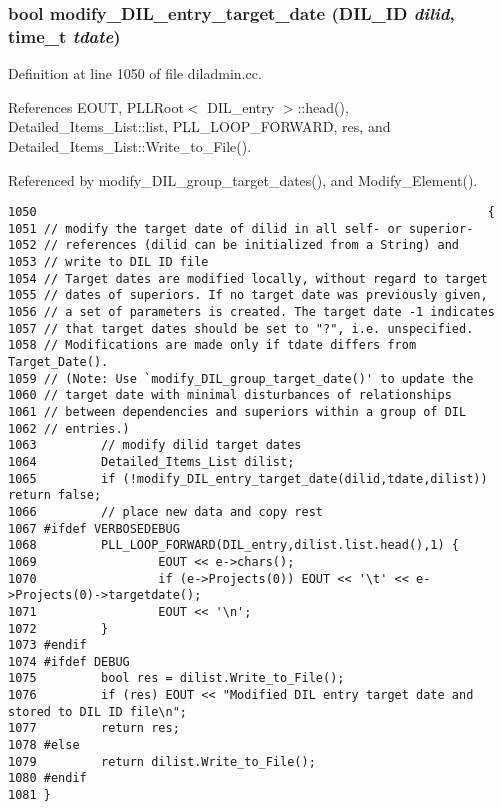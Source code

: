 \subsubsection{\setlength{\rightskip}{0pt plus 5cm}bool modify\_\-DIL\_\-entry\_\-target\_\-date ({\bf DIL\_\-ID} {\em dilid}, time\_\-t {\em tdate})}\label{diladmin_8cc_a16}




Definition at line 1050 of file diladmin.cc.

References EOUT, PLLRoot$<$ DIL\_\-entry $>$::head(), Detailed\_\-Items\_\-List::list, PLL\_\-LOOP\_\-FORWARD, res, and Detailed\_\-Items\_\-List::Write\_\-to\_\-File().

Referenced by modify\_\-DIL\_\-group\_\-target\_\-dates(), and Modify\_\-Element().



\footnotesize\begin{verbatim}1050                                                               {
1051 // modify the target date of dilid in all self- or superior-
1052 // references (dilid can be initialized from a String) and
1053 // write to DIL ID file
1054 // Target dates are modified locally, without regard to target
1055 // dates of superiors. If no target date was previously given,
1056 // a set of parameters is created. The target date -1 indicates
1057 // that target dates should be set to "?", i.e. unspecified.
1058 // Modifications are made only if tdate differs from Target_Date().
1059 // (Note: Use `modify_DIL_group_target_date()' to update the
1060 // target date with minimal disturbances of relationships
1061 // between dependencies and superiors within a group of DIL
1062 // entries.)
1063         // modify dilid target dates
1064         Detailed_Items_List dilist;
1065         if (!modify_DIL_entry_target_date(dilid,tdate,dilist)) return false;
1066         // place new data and copy rest
1067 #ifdef VERBOSEDEBUG
1068         PLL_LOOP_FORWARD(DIL_entry,dilist.list.head(),1) {
1069                 EOUT << e->chars();
1070                 if (e->Projects(0)) EOUT << '\t' << e->Projects(0)->targetdate();
1071                 EOUT << '\n';
1072         }
1073 #endif
1074 #ifdef DEBUG
1075         bool res = dilist.Write_to_File();
1076         if (res) EOUT << "Modified DIL entry target date and stored to DIL ID file\n";
1077         return res;
1078 #else
1079         return dilist.Write_to_File();
1080 #endif
1081 }
\end{verbatim}\normalsize 
{}
